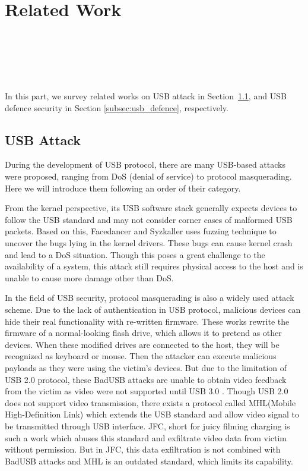 \section{Related Work}
\label{sec:related_work}
\\
\\
\\
\\
\\

In this part, we survey related works on USB attack in Section~\ref{subsec:usb_attack}, and USB defence security in Section \ref{subsec:usb_defence}, respectively.

\subsection{USB Attack}
\label{subsec:usb_attack}
During the development of USB protocol, there are many USB-based attacks were proposed, ranging from DoS (denial of service) to protocol masquerading. Here we will introduce them following an order of their category.

From the kernel perspective, its USB software stack generally expects devices to follow the USB standard and may not consider corner cases of malformed USB packets. Based on this, Facedancer\cite{facedancer} and Syzkaller\cite{syzkaller} uses fuzzing technique to uncover the bugs lying in the kernel drivers. These bugs can cause kernel crash and lead to a DoS situation. Though this poses a great challenge to the availability of a system, this attack still requires physical access to the host and is unable to cause more damage other than DoS.

In the field of USB security, protocol masquerading is also a widely used attack scheme. Due to the lack of authentication in USB protocol, malicious devices can hide their real functionality with re-written firmware\cite{rubber,badusb, rubberducky2020, usbbypassing, iseeyou, usbdriver}. These works rewrite the firmware of a normal-looking flash drive, which allows it to pretend as other devices. When these modified drives are connected to the host, they will be recognized as keyboard or mouse. Then the attacker can execute malicious payloads as they were using the victim's devices. But due to the limitation of USB 2.0\cite{usb20} protocol, these BadUSB attacks are unable to obtain video feedback from the victim as video were not supported until USB 3.0 \cite{usb30}. Though USB 2.0 does not support video transmission, there exists a protocol called MHL(Mobile High-Definition Link) which extends the USB standard and allow video signal to be transmitted through USB interface. JFC\cite{JFC}, short for juicy filming charging is such a work which abuses this standard and exfiltrate video data from victim without permission. But in JFC, this data exfiltration is not combined with BadUSB attacks and MHL is an outdated standard, which limits its capability.

